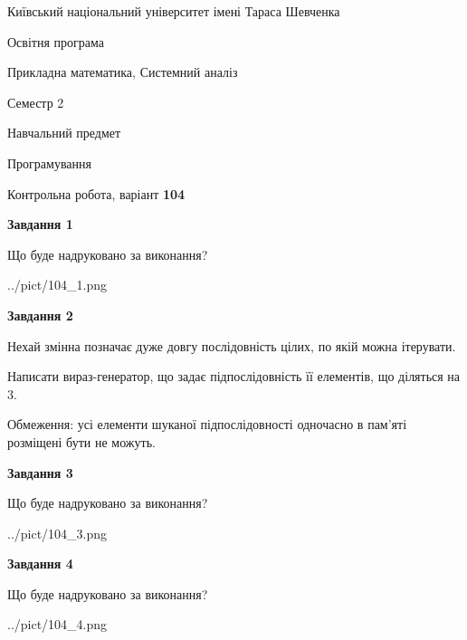 \documentclass[12pt, ukrainian]{article}
\begin{document}
{{\begin {small}\par
{ \center  Київський національний університет імені Тараса Шевченка \par}
{\parbox {5 cm}{Освітня програма \hfill}{\parbox {8 cm}{Прикладна математика, Системний аналіз \hfill}}\parbox {5 cm}{\hfill Семестр 2}}\par
{\parbox {5 cm} {Навчальний предмет \hfill}\parbox {7 cm}{Програмування \hfill}\parbox {6cm}{\hfill}\par}\vspace{-7pt} \end{small}}{\center Контрольна робота, варіант  \No \textbf
{ 104 }\par}}
{
\begin {large}
{\begin {center}\textbf{Завдання 1}\end {center}}\par
Що буде надруковано за виконання?\par\par
\begin{center}
	{../pict/104_1.png}
\end{center}
\newpage

{\begin {center}\textbf{Завдання 2}\end {center}}\par
Нехай змінна  позначає дуже довгу послідовність цілих, по якій можна ітерувати.

Написати вираз-генератор, що задає підпослідовність її елементів, що діляться на 3.

Обмеження: усі елементи шуканої підпослідовності одночасно в пам'яті розміщені бути не можуть.\par
\newpage

{\begin {center}\textbf{Завдання 3}\end {center}}\par
Що буде надруковано за виконання?\par
\begin{center}
	{../pict/104_3.png}
\end{center}
\newpage

{\begin {center}\textbf{Завдання 4}\end {center}}\par
Що буде надруковано за виконання?\par
\begin{center}
	{../pict/104_4.png}
\end{center}
\newpage


\end{large}}
\end{document}
